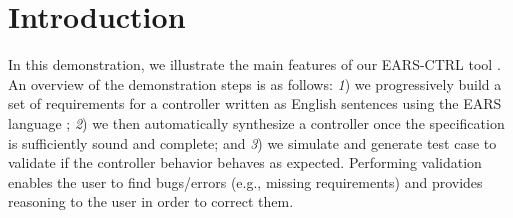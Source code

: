 \vspace{-1cm}
\section{Introduction}
\label{sec:intro}
\vspace{-.3cm}
In this demonstration, we illustrate the main features of our \textsf{EARS-CTRL}
tool \cite{EARSProject}.
An overview of the demonstration steps is as follows: \emph{1}) we
progressively build a set of requirements for a controller written as English
sentences using the EARS language \cite{EARS}; \emph{2}) we then automatically
synthesize a controller once the specification is sufficiently sound and
complete; and \emph{3}) we simulate and generate test case to
validate if the controller behavior behaves as expected.
Performing validation enables the user to find bugs/errors (e.g., missing
requirements) and provides reasoning to the user in order to correct
them.
